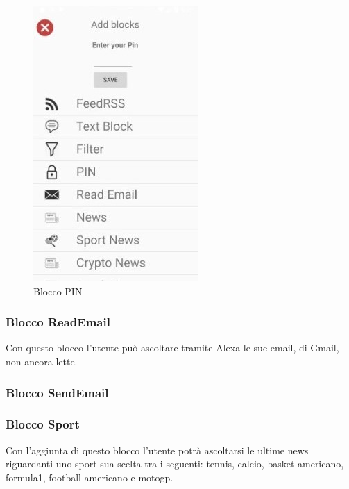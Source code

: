 \begin{figure}[!ht]
	\centering
	\includegraphics[scale=0.8]{images/BlockPIN.jpg}
	\caption{Blocco PIN}
\end{figure}

\subsubsection{Blocco ReadEmail}
Con questo blocco l'utente può ascoltare tramite Alexa le sue email, di Gmail, non ancora lette.


\subsubsection{Blocco SendEmail}

\subsubsection{Blocco Sport}
Con l'aggiunta di questo blocco l'utente potrà ascoltarsi le ultime news riguardanti uno sport sua scelta tra i seguenti: tennis, calcio, basket americano, formula1, football americano e motogp.

